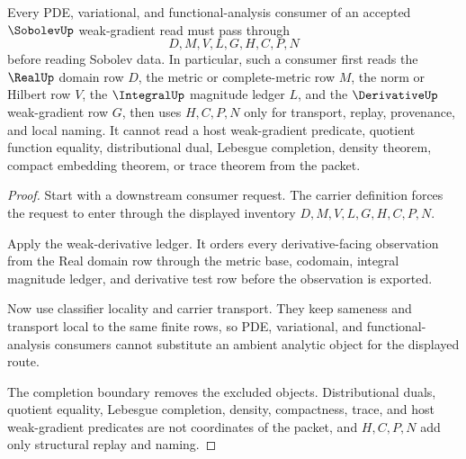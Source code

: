 \begin{theorem}
\label{thm:sobolev-weak-gradient-consumer-boundary}
Every PDE, variational, and functional-analysis consumer of an accepted $\SobolevUp$ weak-gradient read must pass through
$$
D,M,V,L,G,H,C,P,N
$$
before reading Sobolev data. In particular, such a consumer first reads the $\RealUp$ domain row $D$, the metric or complete-metric row $M$, the norm or Hilbert row $V$, the $\IntegralUp$ magnitude ledger $L$, and the $\DerivativeUp$ weak-gradient row $G$, then uses $H,C,P,N$ only for transport, replay, provenance, and local naming. It cannot read a host weak-gradient predicate, quotient function equality, distributional dual, Lebesgue completion, density theorem, compact embedding theorem, or trace theorem from the packet.
\end{theorem}
\begin{proof}
Start with a downstream consumer request. The carrier definition forces the request to enter through the displayed inventory $D,M,V,L,G,H,C,P,N$.

Apply the weak-derivative ledger. It orders every derivative-facing observation from the Real domain row through the metric base, codomain, integral magnitude ledger, and derivative test row before the observation is exported.

Now use classifier locality and carrier transport. They keep sameness and transport local to the same finite rows, so PDE, variational, and functional-analysis consumers cannot substitute an ambient analytic object for the displayed route.

The completion boundary removes the excluded objects. Distributional duals, quotient equality, Lebesgue completion, density, compactness, trace, and host weak-gradient predicates are not coordinates of the packet, and $H,C,P,N$ add only structural replay and naming.
\end{proof}

